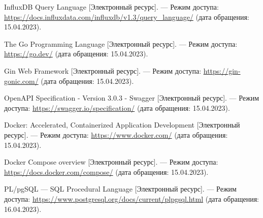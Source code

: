 \begin{thebibliography}{}
	 InfluxDB Query Language [Электронный ресурс]. — Режим доступа: \url{https://docs.influxdata.com/influxdb/v1.3/query_language/} (дата обращения: 15.04.2023).
	 
	 The Go Programming Language [Электронный ресурс]. — Режим доступа: \url{https://go.dev/} (дата обращения: 15.04.2023).
	 
	 Gin Web Framework [Электронный ресурс]. — Режим доступа: \url{https://gin-gonic.com/} (дата обращения: 15.04.2023).
	 
	 OpenAPI Specification - Version 3.0.3 - Swagger [Электронный ресурс]. — Режим доступа: \url{https://swagger.io/specification/} (дата обращения: 15.04.2023).
	 
	 Docker: Accelerated, Containerized Application Development [Электронный ресурс]. — Режим доступа: \url{https://www.docker.com/} (дата обращения: 15.04.2023).
	 
	 Docker Compose overview [Электронный ресурс]. — Режим доступа: \url{https://docs.docker.com/compose/} (дата обращения: 15.04.2023).
	 
	 PL/pgSQL — SQL Procedural Language [Электронный ресурс]. — Режим доступа: \url{https://www.postgresql.org/docs/current/plpgsql.html} (дата обращения: 16.04.2023).
\end{thebibliography}
\endgroup

\pagebreak